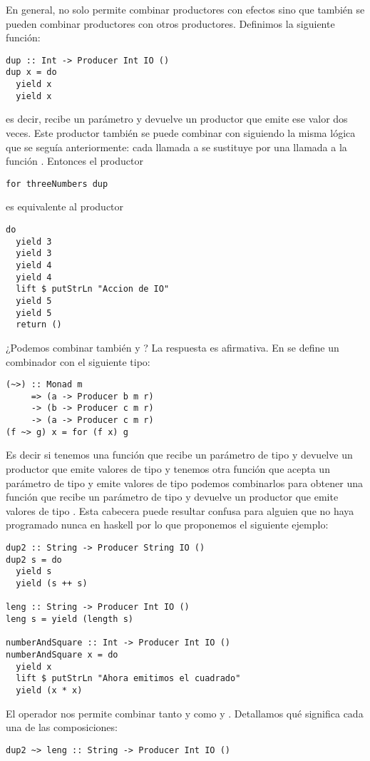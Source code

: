 En general,  no solo permite combinar productores con
efectos sino que también se pueden combinar productores con otros
productores. Definimos la siguiente función:
\begin{verbatim}
dup :: Int -> Producer Int IO ()
dup x = do
  yield x
  yield x
\end{verbatim}
es decir, recibe un parámetro y devuelve un productor que emite
ese valor dos veces. Este productor también se puede combinar con
 siguiendo la misma lógica que se seguía anteriormente:
cada llamada a  se sustituye por una llamada a la función
. Entonces el productor
\begin{verbatim}
for threeNumbers dup
\end{verbatim}
es equivalente al productor
\begin{verbatim}
do
  yield 3
  yield 3
  yield 4
  yield 4
  lift $ putStrLn "Accion de IO"
  yield 5
  yield 5
  return ()
\end{verbatim}
¿Podemos combinar también  y ? La respuesta es
afirmativa. En  se define un combinador con el siguiente
tipo:
\begin{verbatim}
(~>) :: Monad m
     => (a -> Producer b m r)
     -> (b -> Producer c m r)
     -> (a -> Producer c m r)
(f ~> g) x = for (f x) g
\end{verbatim}
Es decir si tenemos una función que recibe un parámetro de tipo 
y devuelve un productor que emite valores de tipo  y tenemos
otra función que acepta un parámetro de tipo  y emite valores
de tipo  podemos combinarlos para obtener una función que
recibe un parámetro de tipo  y devuelve un productor que emite
valores de tipo . Esta cabecera puede resultar confusa para
alguien que no haya programado nunca en haskell por lo que proponemos
el siguiente ejemplo:
\begin{verbatim}
dup2 :: String -> Producer String IO ()
dup2 s = do
  yield s
  yield (s ++ s)

leng :: String -> Producer Int IO ()
leng s = yield (length s)

numberAndSquare :: Int -> Producer Int IO ()
numberAndSquare x = do
  yield x
  lift $ putStrLn "Ahora emitimos el cuadrado"
  yield (x * x)
\end{verbatim}
El operador \cod{\pcomp >} nos permite combinar tanto  y
 como  y . Detallamos
qué significa cada una de las composiciones:
\begin{verbatim}
dup2 ~> leng :: String -> Producer Int IO ()
\end{verbatim}
